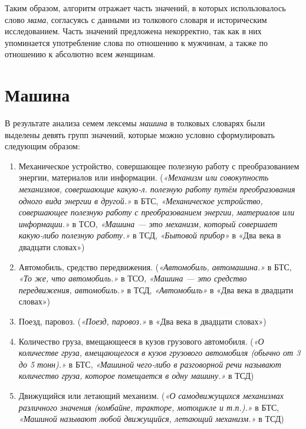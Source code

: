 Таким образом, алгоритм отражает часть значений, в которых использовалось
слово \textit{мама}, согласуясь с данными из толкового словаря и историческим исследованием.
Часть значений предложена некорректно, так как в них упоминается употребление слова по отношению
к мужчинам, а также по отношению к абсолютно всем женщинам.

\section*{Машина}

В результате анализа семем лексемы \textit{машина} в толковых словарях были выделены девять групп значений,
которые можно условно сформулировать следующим образом:

\begin{enumerate}
    \item Механическое устройство, совершающее полезную работу с преобразованием энергии, материалов или информации.
(\textit{«Механизм или совокупность механизмов, совершающие какую-л. полезную работу путём преобразования одного вида энергии в другой.»} в БТС,
\textit{«Механическое устройство, совершающее полезную работу с преобразованием энергии, материалов или информации.»} в ТСО,
\textit{«Машина — это механизм, который совершает какую-либо полезную работу.»} в ТСД,
\textit{«Бытовой прибор»} в «Два века в двадцати словах»)

    \item Автомобиль, средство передвижения.
(\textit{«Автомобиль, автомашина.»} в БТС,
\textit{«То же, что автомобиль.»} в ТСО,
\textit{«Машина — это средство передвижения, автомобиль.»} в ТСД,
\textit{«Автомобиль»} в «Два века в двадцати словах»)

    \item Поезд, паровоз.
(\textit{«Поезд, паровоз.»} в «Два века в двадцати словах»)

    \item Количество груза, вмещающееся в кузов грузового автомобиля.
(\textit{«О количестве груза, вмещающегося в кузов грузового автомобиля (обычно от 3 до 5 тонн).»} в БТС,
\textit{«Машиной чего-либо в разговорной речи называют количество груза, которое помещается в одну машину.»} в ТСД)

    \item Движущийся или летающий механизм.
(\textit{«О самодвижущихся механизмах различного значения (комбайне, тракторе, мотоцикле и т.п.).»} в БТС,
\textit{«Машиной называют любой движущийся, летающий механизм.»} в ТСД)


\end{enumerate}
